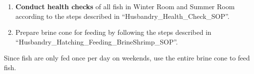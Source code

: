 \documentclass[
  letterpaper,
  DIV=11,
  numbers=noendperiod]{scrreprt}
\begin{document}
\begin{enumerate}
\def\labelenumi{\arabic{enumi}.}
\item
  \textbf{Conduct health checks} of all fish in Winter Room and Summer
  Room according to the steps described in
  ``Husbandry\_Health\_Check\_SOP''.
\item
  Prepare brine cone for feeding by following the steps described in
  ``Husbandry\_Hatching\_Feeding\_BrineShrimp\_SOP''.
\end{enumerate}

\begin{tcolorbox}[enhanced jigsaw, toprule=.15mm, breakable, coltitle=black, leftrule=.75mm, title=\textcolor{quarto-callout-warning-color}{\faExclamationTriangle}\hspace{0.5em}{NOTES}, bottomrule=.15mm, toptitle=1mm, bottomtitle=1mm, colframe=quarto-callout-warning-color-frame, opacityback=0, colback=white, opacitybacktitle=0.6, colbacktitle=quarto-callout-warning-color!10!white, rightrule=.15mm, titlerule=0mm, arc=.35mm, left=2mm]

Since fish are only fed once per day on weekends, use the entire brine
cone to feed fish.

\end{tcolorbox}
\end{document}
